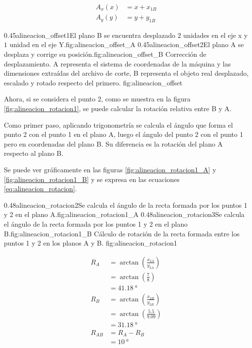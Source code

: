    \begin{equation}
      \begin{aligned}
         A_x(x) &= x+x_{1B} \\
         A_y(y) &= y+y_{1B}
      \end{aligned}
      \label{eq:alineacion_offset}
   \end{equation}

\subfigab
         {0.45}{alineacion_offset1}{El plano B se encuentra desplazado $2$ unidades en el eje x y $1$ unidad en el eje Y.}{fig:alineacion_offset_A}
         {0.45}{alineacion_offset2}{El plano A se desplaza y corrige su posición.}{fig:alineacion_offset_B}
         {Corrección de desplazamiento. A representa el sistema de coordenadas de la máquina y las dimensiones extraídas del archivo de corte, B representa el objeto real desplazado, escalado y rotado respecto del primero.}
         {fig:alineacion_offset}

         Ahora, si se considera el punto 2, como se muestra en la figura \ref{fig:alineacion_rotacion1}, se puede calcular la rotación relativa entre B y A.\par
         Como primer paso, aplicando trigonometría se calcula el ángulo que forma el punto 2 con el punto 1 en el plano A, luego el ángulo del punto 2 con el punto 1 pero en coordenadas del plano B.
         Su diferencia es la rotación del plano A respecto al plano B.\par
         Se puede ver gráficamente en las figuras \ref{fig:alineacion_rotacion1_A} y \ref{fig:alineacion_rotacion1_B} y se expresa en las ecuaciones \ref{eq:alineacion_rotacion}.

\subfigab
            {0.48}{alineacion_rotacion2}{Se calcula el ángulo de la recta formada por los puntos 1 y 2 en el plano A.}{fig:alineacion_rotacion1_A}
            {0.48}{alineacion_rotacion3}{Se calcula el ángulo de la recta formada por los puntos 1 y 2 en el plano B.}{fig:alineacion_rotacion1_B}
            {Cálculo de rotación de la recta formada entre los puntos 1 y 2 en los planos A y B.}
            {fig:alineacion_rotacion1}

   \begin{equation}
      \begin{aligned}
         R_A &= \arctan(\frac{x_{2A}}{y_{2A}}) \\
         &= \arctan(\frac{7}{8}) \\
         &= \SI{41.18}{\degree}\\
         R_B &= \arctan(\frac{x_{2B}}{y_{2B}})\\
         &= \arctan(\frac{5.5}{9.09}) \\
         &= \SI{31.18}{\degree}\\
         R_{AB} &= R_A - R_B\\
         &= \SI{10}{\degree}
      \end{aligned}
      \label{eq:alineacion_rotacion}
   \end{equation}

